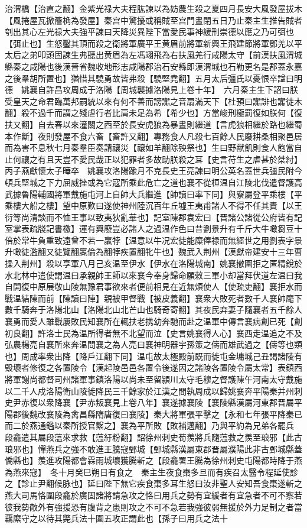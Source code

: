 治渭橋【治直之翻】金紫光禄大夫程肱諫以為妨農生殺之夏四月長安大風發屋拔木【風捲屋瓦掀簷桷為發屋】秦宫中驚擾或稱賊至宫門晝閉五日乃止秦主生推告賊者刳出其心左光禄大夫強平諫曰天降災異陛下當愛民事神緩刑崇德以應之乃可弭也【弭止也】生怒鑿其頂而殺之衛將軍廣平王黄眉前將軍新興王飛建節將軍鄧羌以平太后之弟叩頭固諫生弗聽出黄眉為左馮翊飛為右扶風羌行咸陽太守【前漢扶風渭城縣秦之咸陽也後漢晉省魏收地形志咸陽郡治石安縣即漢渭城也石勒更名是郡蓋永嘉之後羣胡所置也】猶惜其驍勇故皆弗殺【驍堅堯翻】五月太后彊氏以憂恨卒諡曰明德　姚襄自許昌攻周成于洛陽【周城襲據洛陽見上卷十年】　六月秦主生下詔曰朕受皇天之命君臨萬邦嗣統以來有何不善而謗讟之音扇滿天下【杜預曰讟誹也讟徒木翻】殺不過千而謂之殘虐行者比肩未足為希【希少也】方當峻刑極罰復如朕何【復扶又翻】自去春以來潼關之西至於長安虎狼為暴晝則繼道【言虎狼相繼於路也繼蜀本作斷】夜則發屋不食六畜【畜許又翻】專務食人凡殺七百餘人民廢耕桑相聚邑居而為害不息秋七月秦羣臣奏請禳災【禳如羊翻除殃祭也】生曰野獸飢則食人飽當自止何禳之有且天豈不愛民哉正以犯罪者多故助朕殺之耳【史言苻生之虐甚於桀紂】　丙子燕獻懷太子曄卒　姚襄攻洛陽踰月不克長史王亮諫曰明公英名蓋世兵彊民附今頓兵堅城之下力屈威挫或為它寇所乘此危亡之道也襄不從桓温自江陵北伐遣督護高武據魯陽輔國將軍戴施屯河上自帥大兵繼進【帥讀曰率下同】與寮屬登平乘樓【平乘樓大船之樓】望中原歎曰遂使神州陸沉百年丘墟王夷甫諸人不得不任其責【以王衍等尚清談而不恤王事以致夷狄亂華也】記室陳郡袁宏曰【晋諸公諸從公府皆有記室掌表疏牋記書檄】運有興廢豈必諸人之過温作色曰昔劉景升有千斤大牛噉芻豆十倍於常牛負重致遠曾不若一羸㹀【温意以牛况宏徒能糜俸禄而無經世之用劉表字景升噉徒濫翻又徒覽翻羸倫為翻㹀疾置翻牝牛也】魏武入荆州【漢獻帝建安十三年曹操入荆州】殺以享軍八月己亥温至伊水【伊水在洛陽城南】姚襄撤圍拒之匿精銳於水北林中遣使謂温曰承親帥王師以來襄今奉身歸命願敕三軍小却當拜伏道左温曰我自開復中原展敬山陵無豫君事欲來者便前相見在近無煩使人【使疏吏翻】襄拒水而戰温結陳而前【陳讀曰陣】親被甲督戰【被皮義翻】襄衆大敗死者數千人襄帥麾下數千騎奔于洛陽北山【洛陽北山北芒山也騎奇寄翻】其夜民弃妻子隨襄者五千餘人襄勇而愛人雖戰屢敗民知襄所在輒扶老携幼奔馳而赴之温軍中傳言襄病創已死【創初良翻】許洛士民為温所得者無不北望而泣【史言姚襄得人心】襄西走温追之不及弘農楊亮自襄所來奔温問襄之為人亮曰襄神明器宇孫策之儔而雄武過之【儔等也類也】周成率衆出降【降戶江翻下同】温屯故太極殿前既而徙屯金墉城己丑謁諸陵有毁壞者修復之各置陵令【漢起陵邑邑各置令後遂因之諸陵各置陵令屬太常】表鎮西將軍謝尚都督司州諸軍事鎮洛陽以尚未至留潁川太守毛穆之督護陳午河南太守戴施以二千人戍洛陽衛山陵徙降民三千餘家於江漢之間執周成以歸姚襄奔平陽秦并州刺史尹赤復以衆降襄【尹赤叛襄見上卷八年】襄遂據襄陵【襄陵縣漢屬河東郡晋屬平陽郡後魏改襄陵為禽昌縣隋唐復曰襄陵】秦大將軍張平擊之【永和七年張平降秦已而二於燕通鑑以秦所授官繫之】襄為平所敗【敗補邁翻】乃與平約為兄弟各罷兵　段龕遣其屬段蕰來求救【蕰紆粉翻】詔徐州刺史荀羨將兵隨蕰救之羨至琅邪【此古琅邪也】憚燕兵之強不敢進王騰寇鄄城【鄄城縣漢屬東郡晋屬濮陽此非古鄄城縣蓋僑縣也】羨進攻陽都會霖雨城壞獲騰斬之【段龕署王騰為徐州刺史屯陽都時降于燕為燕來寇】　冬十月癸巳朔日有食之　秦主生夜食棗多旦而有疾召太醫令程延使診之【診止尹翻候脉也】延曰陛下無它疾食棗多耳生怒曰汝非聖人安知吾食棗遂斬之　燕大司馬恪圍段龕於廣固諸將請急攻之恪曰用兵之勢有宜緩者有宜急者不可不察若彼我勢敵外有強援恐有腹背之患則攻之不可不急若我強彼弱無援於外力足制之者當覊縻守之以待其斃兵法十圍五攻正謂此也【孫子曰用兵之法十